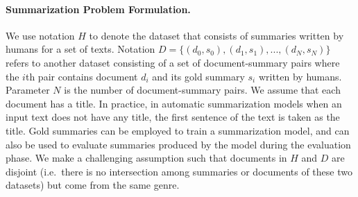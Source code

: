 
\paragraph{Summarization Problem Formulation.}
We use notation $H$ to denote the dataset that consists of summaries written by humans for a set of texts.  
Notation \mbox{$D=\lbrace \left( d_0, s_0 \right), \left( d_1, s_1 \right),...,\left( d_N, s_N \right) \rbrace$} refers to another dataset consisting of a set of document-summary pairs where the $i$th pair contains document $d_i$ and  its gold summary $s_i$ written by humans. 
Parameter $N$ is the number of document-summary pairs.  
We assume that each document has a title. 
In practice, in automatic summarization models when an input text does not have any title, the first sentence of the text is taken as the title. 
Gold summaries can be employed to train a summarization model, and can also be used to evaluate summaries produced by the model during the evaluation phase. 
We make a challenging assumption such that documents in $H$ and $D$ are disjoint (i.e.\ there is no intersection among summaries or documents of these two datasets) but come from the same genre. 

